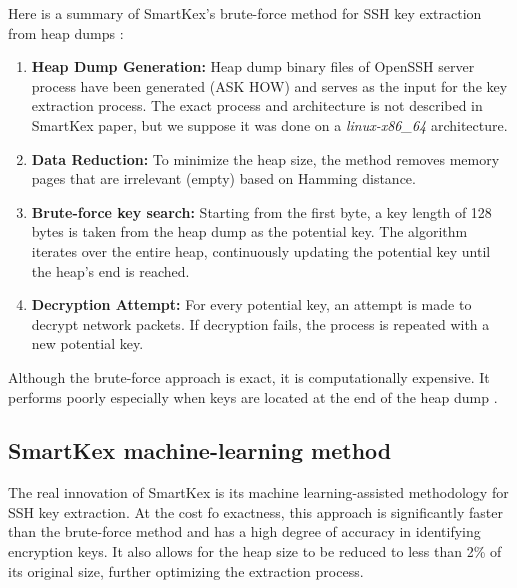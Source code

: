     Here is a summary of SmartKex's brute-force method for SSH key extraction from heap dumps \cite{SmartKex22}:
    \begin{enumerate}
        \item \textbf{Heap Dump Generation:} Heap dump binary files of OpenSSH server process have been generated (ASK HOW) and serves as the input for the key extraction process. The exact process and architecture is not described in SmartKex paper, but we suppose it was done on a \textit{linux-x86\_64} architecture.
        
        \item \textbf{Data Reduction:} To minimize the heap size, the method removes memory pages that are irrelevant (empty) based on Hamming distance.
        
        \item \textbf{Brute-force key search:} Starting from the first byte, a key length of 128 bytes is taken from the heap dump as the potential key. The algorithm iterates over the entire heap, continuously updating the potential key until the heap's end is reached.
        
        \item \textbf{Decryption Attempt:} For every potential key, an attempt is made to decrypt network packets. If decryption fails, the process is repeated with a new potential key.
    \end{enumerate}
    
    Although the brute-force approach is exact, it is computationally expensive. It performs poorly especially when keys are located at the end of the heap dump \cite[section 6.2]{SmartKex22}.

    \subsection{SmartKex machine-learning method}

    The real innovation of SmartKex is its machine learning-assisted methodology for SSH key extraction. At the cost fo exactness, this approach is significantly faster than the brute-force method and has a high degree of accuracy in identifying encryption keys. It also allows for the heap size to be reduced to less than 2\% of its original size, further optimizing the extraction process.

